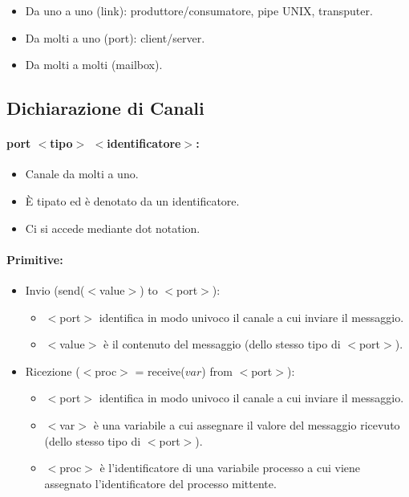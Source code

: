 \begin{itemize}
	\item Da uno a uno (link): produttore/consumatore, pipe UNIX, transputer.
	\item Da molti a uno (port): client/server.
	\item Da molti a molti (mailbox).
\end{itemize}


\subsection{Dichiarazione di Canali}

\paragraph{port $<$tipo$>$ $<$identificatore$>$:}

\begin{itemize}
	\item Canale da molti a uno.
	\item È tipato ed è denotato da un identificatore.
	\item Ci si accede mediante dot notation.
\end{itemize}

\paragraph{Primitive:}

\begin{itemize}
	\item Invio (send($<$value$>$) to $<$port$>$):
	      \begin{itemize}
		      \item $<$port$>$ identifica  in modo univoco il canale a cui inviare il messaggio.
		      \item $<$value$>$ è il contenuto del messaggio (dello stesso tipo di $<$port$>$).
	      \end{itemize}
	\item Ricezione ($<$proc$>$ = receive($var$) from $<$port$>$):
	      \begin{itemize}
		      \item $<$port$>$ identifica  in modo univoco il canale a cui inviare il messaggio.
		      \item $<$var$>$ è una variabile a cui assegnare il valore del messaggio ricevuto  (dello stesso tipo di $<$port$>$).
		      \item $<$proc$>$ è l'identificatore di una variabile processo a cui viene assegnato l'identificatore del processo mittente.
	      \end{itemize}
\end{itemize}


